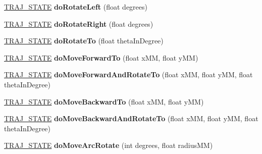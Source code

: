 \begin{DoxyCompactItemize}
\hyperlink{path__manager_8h_adb3360abeb29758da93865c8afcb80eb}{T\+R\+A\+J\+\_\+\+S\+T\+A\+TE} {\bfseries do\+Rotate\+Left} (float degrees)
\item 
\mbox{\label{classAPF9328AsservExtended_a583f946694acc9c6615df591521104b1}} 
\hyperlink{path__manager_8h_adb3360abeb29758da93865c8afcb80eb}{T\+R\+A\+J\+\_\+\+S\+T\+A\+TE} {\bfseries do\+Rotate\+Right} (float degrees)
\item 
\mbox{\label{classAPF9328AsservExtended_a0f9168a280e268b56cb60342c6fce860}} 
\hyperlink{path__manager_8h_adb3360abeb29758da93865c8afcb80eb}{T\+R\+A\+J\+\_\+\+S\+T\+A\+TE} {\bfseries do\+Rotate\+To} (float theta\+In\+Degree)
\item 
\mbox{\label{classAPF9328AsservExtended_a35c5019f69bb53cb9600f209be2631f6}} 
\hyperlink{path__manager_8h_adb3360abeb29758da93865c8afcb80eb}{T\+R\+A\+J\+\_\+\+S\+T\+A\+TE} {\bfseries do\+Move\+Forward\+To} (float x\+MM, float y\+MM)
\item 
\mbox{\label{classAPF9328AsservExtended_a232fb3f6155d9ca47ad1a5fa84f864ee}} 
\hyperlink{path__manager_8h_adb3360abeb29758da93865c8afcb80eb}{T\+R\+A\+J\+\_\+\+S\+T\+A\+TE} {\bfseries do\+Move\+Forward\+And\+Rotate\+To} (float x\+MM, float y\+MM, float theta\+In\+Degree)
\item 
\mbox{\label{classAPF9328AsservExtended_ae3c617b710adf712035fa980c76c9401}} 
\hyperlink{path__manager_8h_adb3360abeb29758da93865c8afcb80eb}{T\+R\+A\+J\+\_\+\+S\+T\+A\+TE} {\bfseries do\+Move\+Backward\+To} (float x\+MM, float y\+MM)
\item 
\mbox{\label{classAPF9328AsservExtended_aff286213f4d9d7be855a74c8c7363543}} 
\hyperlink{path__manager_8h_adb3360abeb29758da93865c8afcb80eb}{T\+R\+A\+J\+\_\+\+S\+T\+A\+TE} {\bfseries do\+Move\+Backward\+And\+Rotate\+To} (float x\+MM, float y\+MM, float theta\+In\+Degree)
\item 
\mbox{\label{classAPF9328AsservExtended_a66bed45318b698cb8b01189e0bc7bd7a}} 
\hyperlink{path__manager_8h_adb3360abeb29758da93865c8afcb80eb}{T\+R\+A\+J\+\_\+\+S\+T\+A\+TE} {\bfseries do\+Move\+Arc\+Rotate} (int degrees, float radius\+MM)

\end{DoxyCompactItemize}
